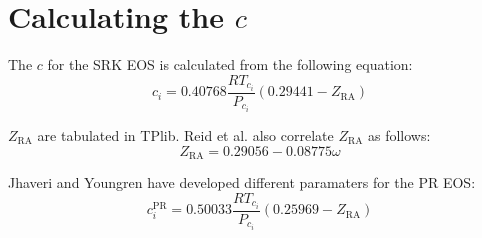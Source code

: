 \documentclass[english]{article}
\begin{document}
\section{Calculating the $c$}
The $c$ for the SRK EOS is calculated from the following equation:
\begin{equation}
  c_i = 0.40768\frac{R T_{c_i}}{P_{c_i}}\left(0.29441- Z_{\text{RA}}\right)
\label{eq:ci}
\end{equation}

$Z_{\text{RA}}$ are tabulated in TPlib. Reid et al. \cite{Reid1987}
also correlate $Z_{\text{RA}}$ as follows:
\begin{equation}
  Z_{\text{RA}} = 0.29056 - 0.08775 \omega
\label{eq:zra}
\end{equation}

Jhaveri and Youngren \cite{Jhaveri1988} have developed different paramaters for the PR EOS:
\begin{equation}
  c_i^{\text{PR}} = 0.50033\frac{R T_{c_i}}{P_{c_i}}\left(0.25969- Z_{\text{RA}}\right)
\label{eq:ci_PR}
\end{equation}
\clearpage


\end{document}
